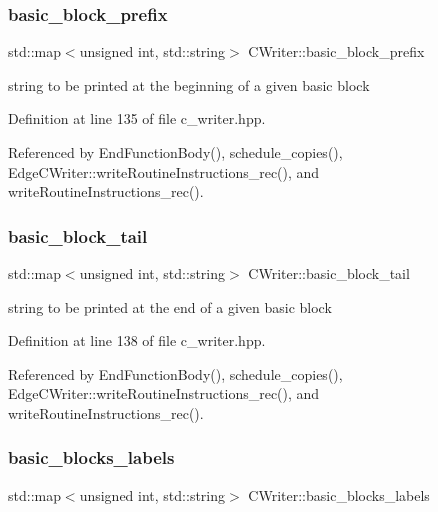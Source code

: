 \subsubsection{\texorpdfstring{basic\+\_\+block\+\_\+prefix}{basic\_block\_prefix}}
{\footnotesize\ttfamily std\+::map$<$unsigned int, std\+::string$>$ C\+Writer\+::basic\+\_\+block\+\_\+prefix\hspace{0.3cm}{\ttfamily [protected]}}



string to be printed at the beginning of a given basic block 



Definition at line 135 of file c\+\_\+writer.\+hpp.



Referenced by End\+Function\+Body(), schedule\+\_\+copies(), Edge\+C\+Writer\+::write\+Routine\+Instructions\+\_\+rec(), and write\+Routine\+Instructions\+\_\+rec().

\mbox{\label{classCWriter_ab389125a678d1021c5ea50b3e174310b}} 
\subsubsection{\texorpdfstring{basic\+\_\+block\+\_\+tail}{basic\_block\_tail}}
{\footnotesize\ttfamily std\+::map$<$unsigned int, std\+::string$>$ C\+Writer\+::basic\+\_\+block\+\_\+tail\hspace{0.3cm}{\ttfamily [protected]}}



string to be printed at the end of a given basic block 



Definition at line 138 of file c\+\_\+writer.\+hpp.



Referenced by End\+Function\+Body(), schedule\+\_\+copies(), Edge\+C\+Writer\+::write\+Routine\+Instructions\+\_\+rec(), and write\+Routine\+Instructions\+\_\+rec().

\mbox{\label{classCWriter_ad7aed67c7d0699eee2a224e68419f0a1}} 
\subsubsection{\texorpdfstring{basic\+\_\+blocks\+\_\+labels}{basic\_blocks\_labels}}
{\footnotesize\ttfamily std\+::map$<$unsigned int, std\+::string$>$ C\+Writer\+::basic\+\_\+blocks\+\_\+labels\hspace{0.3cm}{\ttfamily [protected]}}



